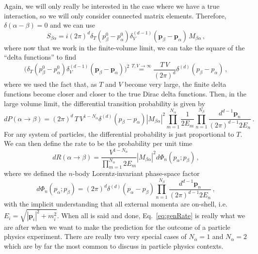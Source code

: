 \documentclass{article}
\numberwithin{equation}{subsection}
\begin{document}
Again, we will only really be interested in the case where we have a true interaction, so we will only consider connected matrix elements. Therefore, $\delta(\alpha - \beta) = 0$
and we can use
\begin{equation}
	S_{\beta\alpha} = i(2\pi)^d\delta_T(p_\beta^0 - p_\alpha^0)\delta^{(d-1)}_V(\mathbf{p}_\beta - \mathbf{p}_\alpha)\,M_{\beta\alpha}\,,
\end{equation}
where now that we work in the finite-volume limit, we can take the square of the ``delta functions'' to find
\begin{equation}
	\big(\delta_T(p_\beta^0 - p_\alpha^0)\delta_V^{(d-1)}(\mathbf{p}_\beta - \mathbf{p}_\alpha)\big)^2 \overset{T,V\to\infty}{=}
	\frac{T\,V}{(2\pi)^d}\delta^{(d)}(p_\beta - p_\alpha)\,,
\end{equation}
where we used the fact that, as $T$ and $V$ become very large, the finite delta functions become closer and closer to the true Dirac delta functions. Then, in the
large volume limit, the differential transition probability is given by
\begin{equation}
	dP(\alpha \to \beta) = (2\pi)^d\,T\,V^{1-N_\alpha}\delta^{(d)}(p_\beta - p_\alpha)|M_{\beta\alpha}|^2
	\prod_{m=1}^{N_\alpha}\frac{1}{2E_m}\prod_{n = 1}^{N_\beta}\frac{d^{d-1}\mathbf{p}_n}{(2\pi)^{d-1}2E_n}\,.
\end{equation}
For any system of particles, the differential probability is just proportional to $T$. We can then define the rate to be the probability per unit time
\begin{equation}\label{eq:genRate}
	dR(\alpha\to\beta) = \frac{V^{1-N_\alpha}}{\prod_{m=1}^{N_\alpha}2E_m}|M_{\beta\alpha}|^2d\Phi_{n}(p_\alpha;p_\beta)\,,
\end{equation}
where we defined the $n$-body Lorentz-invariant phase-space factor
\begin{equation}
	d\Phi_n(p_\alpha;p_\beta) = (2\pi)^d\delta^{(d)}(p_\alpha - p_\beta)\prod_{n = 1}^{N_\beta}\frac{d^{d-1}\mathbf{p}_n}{(2\pi)^{d-1}2E_n}\,,
\end{equation}
with the implicit understanding that all external momenta are on-shell, i.e. $E_i = \sqrt{|\mathbf{p}_i|^2 + m_i^2}$. When all is said and done, Eq.~\eqref{eq:genRate}
is really what we are after when we want to make the prediction for the outcome of a particle physics experiment. There are really two very special cases of $N_\alpha = 1$ 
and $N_\alpha = 2$ which are by far the most common to discuss in particle physics contexts.
\end{document}
